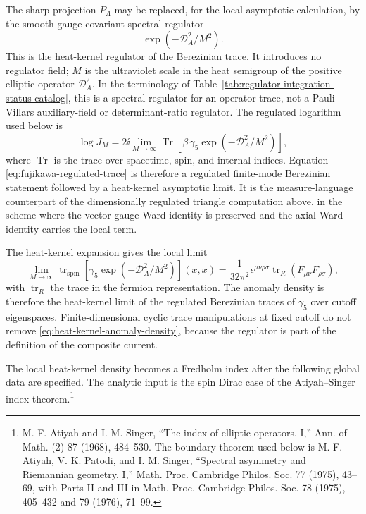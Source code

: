 The sharp projection \(P_\Lambda\) may be replaced, for the local asymptotic
calculation, by the smooth gauge-covariant spectral regulator
\[
  \exp(-\mathcal D_A^2/M^2).
\]
This is the heat-kernel regulator of the Berezinian trace.  It introduces no
regulator field; \(M\) is the ultraviolet scale in the heat semigroup of the
positive elliptic operator \(\mathcal D_A^2\).  In the terminology of
Table~\ref{tab:regulator-integration-status-catalog}, this is a spectral
regulator for an operator trace, not a Pauli--Villars auxiliary-field or
determinant-ratio regulator.  The regulated logarithm used below is
\begin{equation}
  \log J_M
  =
  2\ii\lim_{M\to\infty}
  \operatorname{Tr}
  \left[
  \beta\,\gamma_5
  \exp\left(-\mathcal D_A^2/M^2\right)
  \right],
  \label{eq:fujikawa-regulated-trace}
\end{equation}
where \(\operatorname{Tr}\) is the trace over spacetime, spin, and internal
indices.  Equation \eqref{eq:fujikawa-regulated-trace} is therefore a
regulated finite-mode Berezinian statement followed by a heat-kernel
asymptotic limit.  It is the measure-language counterpart of the
dimensionally regulated triangle computation above, in the scheme where the
vector gauge Ward identity is preserved and the axial Ward identity carries
the local term.

The heat-kernel expansion gives the local limit
\begin{equation}
  \lim_{M\to\infty}
  \operatorname{tr}_{\mathrm{spin}}
  \left[
  \gamma_5
  \exp\left(-\mathcal D_A^2/M^2\right)
  \right](x,x)
  =
  \frac{1}{32\pi^2}
  \epsilon^{\mu\nu\rho\sigma}
  \operatorname{tr}_{R}(F_{\mu\nu}F_{\rho\sigma}),
  \label{eq:heat-kernel-anomaly-density}
\end{equation}
with \(\operatorname{tr}_{R}\) the trace in the fermion representation.  The
anomaly density is therefore the heat-kernel limit of the regulated
Berezinian traces of \(\gamma_5\) over cutoff eigenspaces.  Finite-dimensional
cyclic trace manipulations at fixed cutoff do not remove
\eqref{eq:heat-kernel-anomaly-density}, because the regulator is part of the
definition of the composite current.

The local heat-kernel density becomes a Fredholm index after the following
global data are specified.  The analytic input is the spin Dirac case of the
Atiyah--Singer index theorem.\footnote{M. F. Atiyah and
I. M. Singer, ``The index of elliptic operators. I,'' Ann. of Math. (2) 87
(1968), 484--530.  The boundary theorem used below is M. F. Atiyah,
V. K. Patodi, and I. M. Singer, ``Spectral asymmetry and Riemannian
geometry. I,'' Math. Proc. Cambridge Philos. Soc. 77 (1975), 43--69, with
Parts II and III in Math. Proc. Cambridge Philos. Soc. 78 (1975), 405--432
and 79 (1976), 71--99.}

